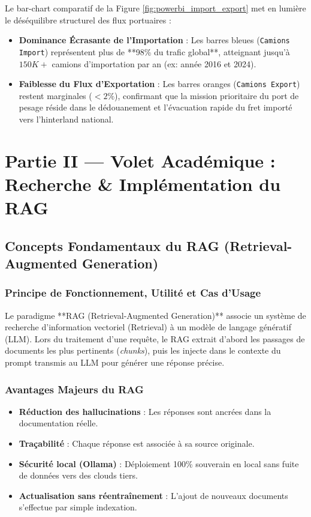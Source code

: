 \documentclass[12pt,a4paper,oneside]{report}
\begin{document}
Le bar-chart comparatif de la Figure \ref{fig:powerbi_import_export} met en lumière le déséquilibre structurel des flux portuaires :
\begin{itemize}
    \item \textbf{Dominance Écrasante de l'Importation} : Les barres bleues (\texttt{Camions Import}) représentent plus de **98\% du trafic global**, atteignant jusqu'à $150K+$ camions d'importation par an (ex: année 2016 et 2024).
    \item \textbf{Faiblesse du Flux d'Exportation} : Les barres oranges (\texttt{Camions Export}) restent marginales ($<2\%$), confirmant que la mission prioritaire du port de pesage réside dans le dédouanement et l'évacuation rapide du fret importé vers l'hinterland national.
\end{itemize}

\newpage

\chapter{Partie II — Volet Académique : Recherche \& Implémentation du RAG}

\section{Concepts Fondamentaux du RAG (Retrieval-Augmented Generation)}

\subsection{Principe de Fonctionnement, Utilité et Cas d'Usage}
Le paradigme **RAG (Retrieval-Augmented Generation)** associe un système de recherche d'information vectoriel (Retrieval) à un modèle de langage génératif (LLM). Lors du traitement d'une requête, le RAG extrait d'abord les passages de documents les plus pertinents (\textit{chunks}), puis les injecte dans le contexte du prompt transmis au LLM pour générer une réponse précise.

\subsection{Avantages Majeurs du RAG}
\begin{itemize}
    \item \textbf{Réduction des hallucinations} : Les réponses sont ancrées dans la documentation réelle.
    \item \textbf{Traçabilité} : Chaque réponse est associée à sa source originale.
    \item \textbf{Sécurité local (Ollama)} : Déploiement 100\% souverain en local sans fuite de données vers des clouds tiers.
    \item \textbf{Actualisation sans réentraînement} : L'ajout de nouveaux documents s'effectue par simple indexation.
\end{itemize}
\end{document}
